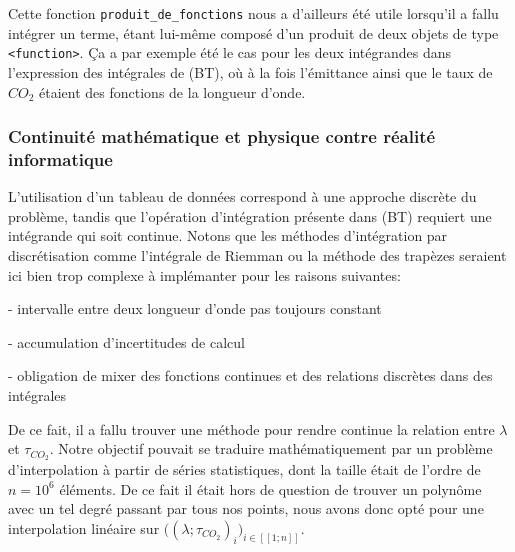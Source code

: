\documentclass[a4paper, 12pt]{report} %
\begin{document}
    \indent Cette fonction \texttt{produit_de_fonctions} nous a
d'ailleurs été utile lorsqu'il a fallu intégrer un terme, étant lui-même composé d'un produit de deux objets de type \texttt{<function>}. 
Ça a par exemple été le cas pour les deux intégrandes dans l'expression des intégrales de (BT), où à la fois l'émittance ainsi que le taux de $CO_2$ étaient des fonctions de la longueur d'onde.

\subsubsection{Continuité mathématique et physique contre réalité informatique}

    L'utilisation d'un tableau de données correspond à une approche
discrète du problème, tandis que l'opération d'intégration présente dans (BT) requiert une intégrande qui soit continue. Notons que les méthodes d'intégration par discrétisation comme l'intégrale de Riemman ou la méthode des trapèzes seraient ici bien trop complexe à implémanter pour les raisons suivantes: \newline
    \par - intervalle entre deux longueur d'onde pas toujours constant
    \par - accumulation d'incertitudes de calcul
    \par - obligation de mixer des fonctions continues et des relations discrètes dans des intégrales
    \vspace{\baselineskip}

    De ce fait, il a fallu trouver une méthode pour rendre continue la
relation entre $\lambda$ et $\tau_{CO_2}$. Notre objectif pouvait se traduire mathématiquement par un problème d'interpolation à partir de séries statistiques, dont la taille était de l'ordre de $n=10^6$ éléments. De ce fait il était hors de question de trouver un polynôme avec un tel degré passant par tous nos points, nous avons donc opté pour une interpolation linéaire sur $\big((\lambda;\tau_{CO_2})_i\big)_{i \in [\![1;n]\!]}$.
\vspace{\baselineskip}
\end{document}
